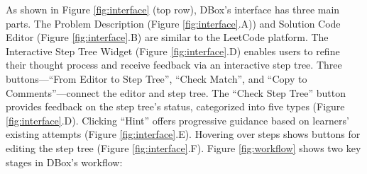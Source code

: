 As shown in Figure \ref{fig:interface} (top row), DBox's interface has three main parts. The Problem Description (Figure \ref{fig:interface}.A)) and Solution Code Editor (Figure \ref{fig:interface}.B) are similar to the LeetCode platform.
The Interactive Step Tree Widget (Figure \ref{fig:interface}.D) enables users to refine their thought process and receive feedback via an interactive step tree. 
Three buttons—``From Editor to Step Tree'', ``Check Match'', and ``Copy to Comments''—connect the editor and step tree. 
The ``Check Step Tree'' button provides feedback on the step tree's status, categorized into five types (Figure \ref{fig:interface}.D). 
Clicking ``Hint'' offers progressive guidance based on learners' existing attempts (Figure \ref{fig:interface}.E). 
Hovering over steps shows buttons for editing the step tree (Figure \ref{fig:interface}.F).
Figure \ref{fig:workflow} shows two key stages in DBox's workflow:
